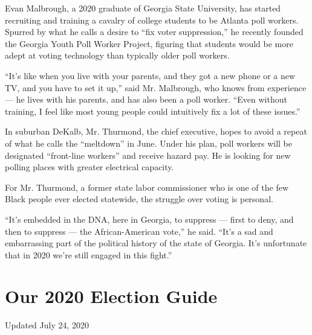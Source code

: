 Evan Malbrough, a 2020 graduate of Georgia State University, has started
recruiting and training a cavalry of college students to be Atlanta poll
workers. Spurred by what he calls a desire to ``fix voter suppression,''
he recently founded the Georgia Youth Poll Worker Project, figuring that
students would be more adept at voting technology than typically older
poll workers.

``It's like when you live with your parents, and they got a new phone or
a new TV, and you have to set it up,'' said Mr. Malbrough, who knows
from experience --- he lives with his parents, and has also been a poll
worker. ``Even without training, I feel like most young people could
intuitively fix a lot of these issues.''

In suburban DeKalb, Mr. Thurmond, the chief executive, hopes to avoid a
repeat of what he calls the ``meltdown'' in June. Under his plan, poll
workers will be designated ``front-line workers'' and receive hazard
pay. He is looking for new polling places with greater electrical
capacity.

For Mr. Thurmond, a former state labor commissioner who is one of the
few Black people ever elected statewide, the struggle over voting is
personal.

``It's embedded in the DNA, here in Georgia, to suppress --- first to
deny, and then to suppress --- the African-American vote,'' he said.
``It's a sad and embarrassing part of the political history of the state
of Georgia. It's unfortunate that in 2020 we're still engaged in this
fight.''

\hypertarget{our-2020-election-guide}{%
\section{Our 2020 Election Guide}\label{our-2020-election-guide}}

Updated July 24, 2020

